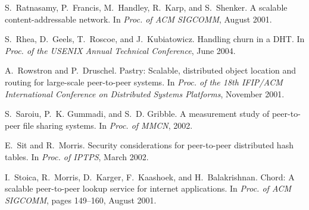 \documentclass{sig-alt-release2}
\begin{document}
\begin{thebibliography}{10}
S.~Ratnasamy, P.~Francis, M.~Handley, R.~Karp, and S.~Shenker.
\newblock A scalable content-addressable network.
\newblock In {\em Proc. of ACM SIGCOMM}, August 2001.

S.~Rhea, D.~Geels, T.~Roscoe, and J.~Kubiatowicz.
\newblock Handling churn in a {DHT}.
\newblock In {\em Proc. of the USENIX Annual Technical Conference}, June 2004.

A.~Rowstron and P.~Druschel.
\newblock Pastry: Scalable, distributed object location and routing for
  large-scale peer-to-peer systems.
\newblock In {\em Proc. of the 18th IFIP/ACM International Conference on
  Distributed Systems Platforms}, November 2001.

S.~Saroiu, P.~K. Gummadi, and S.~D. Gribble.
\newblock A measurement study of peer-to-peer file sharing systems.
\newblock In {\em Proc. of MMCN}, 2002.

E.~Sit and R.~Morris.
\newblock Security considerations for peer-to-peer distributed hash tables.
\newblock In {\em Proc. of IPTPS}, March 2002.

I.~Stoica, R.~Morris, D.~Karger, F.~Kaashoek, and H.~Balakrishnan.
\newblock Chord: A scalable peer-to-peer lookup service for internet
  applications.
\newblock In {\em Proc. of ACM SIGCOMM}, pages 149--160, August 2001.

\end{thebibliography}
\end{document}
